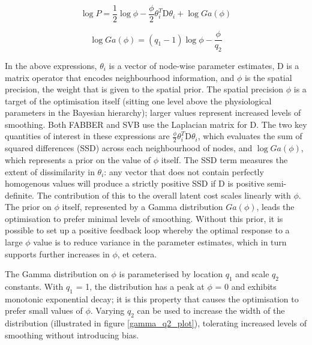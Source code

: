 \documentclass[12pt]{report}
\newcommand{\mat}[1]{\mathrm{#1}}
\begin{document}
\begin{equation}
\log{P} = \frac{1}{2}\log{\phi} - \frac{\phi}{2}\theta_i^T\mat{D}\theta_i + \log{Ga(\phi)}
\end{equation}

\begin{equation}
\log{Ga(\phi)} = (q_1 - 1) \log{\phi} - \frac{\phi}{q_2} 
\end{equation}

In the above expressions, $\theta_i$ is a vector of node-wise parameter estimates, $\mat{D}$ is a matrix operator that encodes neighbourhood information, and $\phi$ is the spatial precision, the weight that is given to the spatial prior. The spatial precision $\phi$ is a target of the optimisation itself (sitting one level above the physiological parameters in the Bayesian hierarchy); larger values represent increased levels of smoothing. Both FABBER and SVB use the Laplacian matrix for $\mat{D}$. The two key quantities of interest in these expressions are $\frac{\phi}{2}\theta_i^T\mat{D}\theta_i$, which evaluates the sum of squared differences (SSD) across each neighbourhood of nodes, and $\log{Ga(\phi)}$, which represents a prior on the value of $\phi$ itself. The SSD term measures the extent of dissimilarity in $\theta_i$: any vector that does not contain perfectly homogenous values will produce a strictly positive SSD if $\mat{D}$ is positive semi-definite. The contribution of this to the overall latent cost scales linearly with $\phi$. The prior on $\phi$ itself, represented by a Gamma distribution $Ga(\phi)$, leads the optimisation to prefer minimal levels of smoothing. Without this prior, it is possible to set up a positive feedback loop whereby the optimal response to a large $\phi$ value is to reduce variance in the parameter estimates, which in turn supports further increases in $\phi$, et cetera. 

The Gamma distribution on $\phi$ is parameterised by location $q_1$ and scale $q_2$ constants. With $q_1$ = 1, the distribution has a peak at $\phi$ = 0 and exhibits monotonic exponential decay; it is this property that causes the optimisation to prefer small values of $\phi$. Varying $q_2$ can be used to increase the width of the distribution (illustrated in figure \ref{gamma_q2_plot}), tolerating increased levels of smoothing without introducing bias. 
\end{document}
